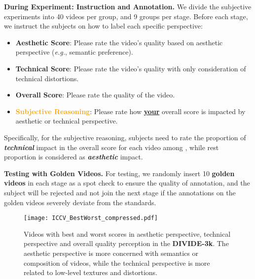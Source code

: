 \documentclass[10pt,twocolumn,letterpaper]{article}
\renewcommand{\paragraph}[1]{\noindent \textbf{#1}}
\newcommand{\blue}[1]{\textbf{\textcolor{mblue}{#1}}}
\newcommand{\overall}[1]{\textbf{\textcolor{mgreenblue}{#1}}}
\newcommand{\orange}[1]{\textbf{\textcolor{orange}{#1}}}
\newcommand{\green}[1]{\textcolor{mgreen}{#1}}
\begin{document}
\paragraph{During Experiment: Instruction and Annotation.} We divide the subjective experiments into 40 videos per group, and 9 groups per stage. Before each stage, we instruct the subjects on how to label each specific perspective:

\begin{itemize}
\item \textbf{\blue{Aesthetic Score}}: Please rate the video's quality based on aesthetic perspective (\textit{e.g.}, semantic preference).
\item \textbf{\green{Technical Score}}: Please rate the video's quality with only consideration of technical distortions.
\item \textbf{\overall{Overall Score}}: Please rate the quality of the video.
\item \textbf{\orange{Subjective Reasoning}}: Please rate how \underline{\textbf{your}} overall score is
 impacted by aesthetic or technical perspective.
\end{itemize}
Specifically, for the subjective reasoning, subjects need to rate the proportion of \textbf{\green{\textit{technical}}} impact in the overall score for each video among , while rest proportion is considered as \textbf{\blue{\textit{aesthetic}}} impact.

\paragraph{Testing with Golden Videos.} For testing, we randomly insert 10 \textbf{golden videos} in each stage as a spot check to ensure the quality of annotation, and the subject will be rejected and not join the next stage if the annotations on the golden videos severely deviate from the standards.

\begin{figure*}
    \centering
    \texttt{[image: ICCV\_BestWorst\_compressed.pdf]}
    \vspace{-16pt}
    \caption{Videos with best and worst scores in aesthetic perspective, technical perspective and overall quality perception in the \textbf{DIVIDE-3k}. The aesthetic perspective is more concerned with semantics or composition of videos, while the technical perspective is more related to low-level textures and distortions.}
    \label{fig:dividebestworst}
    \vspace{-10pt}
\end{figure*}
\end{document}

